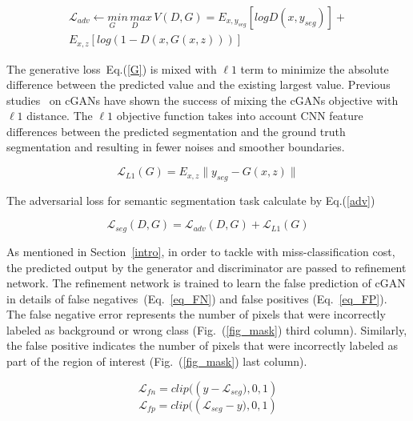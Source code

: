 \documentclass[10pt,twocolumn,letterpaper]{article}
\begin{document}
\begin{equation} \label{eq_svGAN}
\begin{split}
\mathcal{L}_{adv} \leftarrow \underset{G} min \,  \underset{D } max \, V(D, G)
   = E_{x,y_{seg}} [log D(x,y_{seg})] + \\
     E_{x,z} [log (1-D(x, G(x,z)))]
\end{split}
\end{equation}

The generative loss~Eq.(\ref{G}) is mixed with $\ell1$ term to minimize the absolute difference between the predicted value and the existing largest value. Previous studies~\cite{Phillipimagetoimage2017,XueXZLH17} on cGANs have shown the success of mixing the cGANs objective with $\ell1$ distance.
The $\ell1$ objective function takes into account CNN feature differences between the predicted segmentation and the ground truth segmentation and resulting in fewer noises and smoother boundaries.

\begin{equation} \label{G}
 \mathcal{L}_{L1}(G) = E_{x,z} \parallel y_{seg} - G(x,z) \parallel  
\end{equation}

The adversarial loss for semantic segmentation task calculate by Eq.(\ref{adv})

\begin{equation} \label{adv}
\mathcal{L}_{seg} (D, G) = \mathcal{L}_{adv} (D, G) + \mathcal{L}_{L1}(G) 
\end{equation}

As mentioned in Section~\ref{intro}, in order to tackle with miss-classification cost, the predicted output by the generator and discriminator are passed to refinement network. The refinement network is trained to learn the false prediction of cGAN in details of false negatives~(Eq.~\ref{eq_FN}) and false positives (Eq.~\ref{eq_FP}).  
The false negative error represents the number of pixels that were incorrectly labeled as background or wrong class (Fig.~(\ref{fig_mask}) third column). Similarly, the false positive indicates the number of pixels that were incorrectly labeled as part of the region of interest (Fig.~(\ref{fig_mask}) last column).

\begin{equation} \label{eq_FN}
\mathcal{L}_{fn} =  clip {((y - {\mathcal{L}_{seg} )}, 0, 1)} 
\end{equation}\begin{equation} \label{eq_FP}
\mathcal{L}_{fp} =  clip {(({\mathcal{L}_{seg}- y)} , 0, 1)} 
\end{equation}
\end{document}
